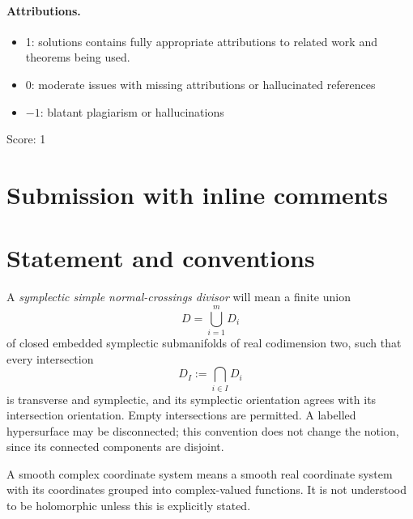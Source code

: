 \documentclass[11pt]{article}
\theoremstyle{definition}
\theoremstyle{remark}
\begin{document}
\paragraph{Attributions.}
\begin{itemize}
	\item  1: solutions contains fully appropriate attributions
		to related work and theorems being used.
	\item  0: moderate issues with missing attributions or hallucinated references
	\item  $-1$: blatant plagiarism or hallucinations
\end{itemize}

\noindent Score: 1

\newpage
\section{Submission with inline comments}


\begin{abstract}
The answer is affirmative, with the cohomologous deformation allowed in
the question.  The proof first enlarges the divisor by auxiliary
symplectic hypersurfaces so that their cohomology classes satisfy a
redundancy condition.  An integral matrix of relations among these
classes then produces globally defined, smooth, nonvanishing functions
on the divisor complement.  Locally, suitable roots of monomials in
these functions are defining coordinates.  A convexity argument for
tame almost complex structures makes the required functions
holomorphic simultaneously.
\end{abstract}


\section{Statement and conventions}

A \emph{symplectic simple normal-crossings divisor} will mean a finite
union
\[
D=\bigcup_{i=1}^{m}D_i
\]
of closed embedded symplectic submanifolds of real codimension two,
such that every intersection
\[
D_I:=\bigcap_{i\in I}D_i
\]
is transverse and symplectic, and its symplectic orientation agrees
with its intersection orientation.  Empty intersections are permitted.
A labelled hypersurface may be disconnected; this convention does not
change the notion, since its connected components are disjoint.

A smooth complex coordinate system means a smooth real coordinate
system with its coordinates grouped into complex-valued functions.
It is not understood to be holomorphic unless this is explicitly
stated.
\end{document}
